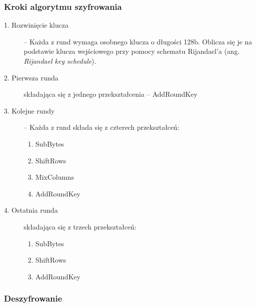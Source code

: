 \subsubsection{Kroki algorytmu szyfrowania}
\begin{description}
\item[1. Rozwinięcie klucza] -- Każda z rund wymaga osobnego klucza o długości 128b. Oblicza się je na podstawie klucza wejściowego przy pomocy schematu Rijandael'a (ang. \textit{Rijandael key schedule}).
\item[2. Pierwsza runda] składająca się z jednego przekształcenia -- AddRoundKey
\item[3. Kolejne rundy] -- Każda z rund składa się z czterech przekształceń:
\begin{enumerate}
\item SubBytes
\item ShiftRows
\item MixColumns
\item AddRoundKey
\end{enumerate}
\item[4. Ostatnia runda] składająca się z trzech przekształceń:
\begin{enumerate}
\item SubBytes
\item ShiftRows
\item AddRoundKey
\end{enumerate}

\end{description}

\subsubsection{Deszyfrowanie}



\newpage